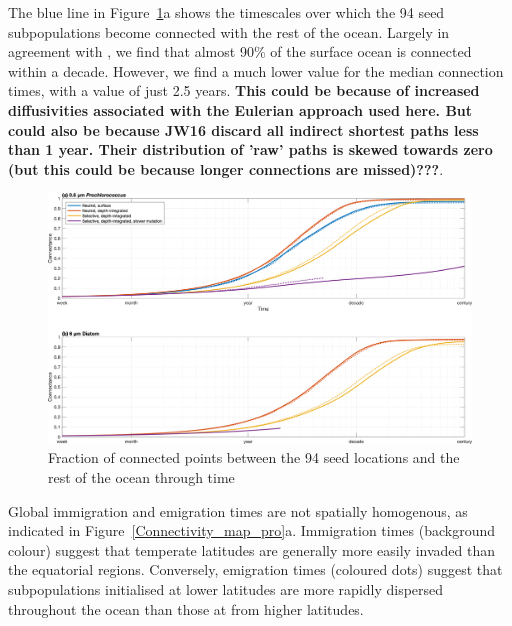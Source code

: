\documentclass[12pt]{article}
\begin{document}
The blue line in Figure~\ref{Cumulative}a shows the timescales over which the 94 seed subpopulations become connected with the rest of the ocean. Largely in agreement with \citet{Jonsson:2016}, we find that almost 90\% of the surface ocean is connected within a decade. However, we find a much lower value for the median connection times, with a value of just 2.5 years. \textbf{This could be because of increased diffusivities associated with the Eulerian approach used here. But could also be because JW16 discard all indirect shortest paths less than 1 year. Their distribution of 'raw' paths is skewed towards zero (but this could be because longer connections are missed)???}.

\begin{figure}[htp!]
    \centering
        \includegraphics[width=1\textwidth]{../Figures/cumulative_connections.png}
\caption{Fraction of connected points between the 94 seed locations and  the rest of the ocean through time}
\label{Cumulative}
\end{figure}

Global immigration and emigration times are not spatially homogenous, as indicated in Figure~\ref{Connectivity_map_pro}a. Immigration times (background colour) suggest that temperate latitudes are generally more easily invaded than the equatorial regions. Conversely, emigration times (coloured dots) suggest that subpopulations initialised at lower latitudes are more rapidly dispersed throughout the ocean than those at from higher latitudes. 
\end{document}
